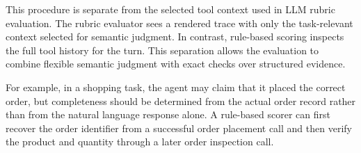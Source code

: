 \documentclass{llmxive}
\providecommand{\tcolorboxPromptExampleRuleBasedEvaluatorTitleText}{\fontsize{10}{12}\selectfont}
\providecommand{\tcolorboxPromptExampleRuleBasedEvaluatorCommonText}{\fontsize{7.5}{9}\selectfont}
\providecommand{\tcolorboxPromptExampleRuleBasedEvaluatorTitleBeforeVspace}{\vspace{10 pt}}
\providecommand{\tcolorboxPromptExampleRuleBasedEvaluatorCommonTextLineSkip}{\setlength{\baselineskip}{5 pt}}
\begin{document}
This procedure is separate from the selected tool context used in LLM rubric evaluation. The rubric evaluator sees a rendered trace with only the task-relevant context selected for semantic judgment. In contrast, rule-based scoring inspects the full tool history for the turn. This separation allows the evaluation to combine flexible semantic judgment with exact checks over structured evidence.

For example, in a shopping task, the agent may claim that it placed the correct order, but completeness should be determined from the actual order record rather than from the natural language response alone. A rule-based scorer can first recover the order identifier from a successful order placement call and then verify the product and quantity through a later order inspection call.


\renewcommand{\tcolorboxPromptExampleRuleBasedEvaluatorTitleText}{}
\renewcommand{\tcolorboxPromptExampleRuleBasedEvaluatorCommonText}{}
\renewcommand{\tcolorboxPromptExampleRuleBasedEvaluatorTitleBeforeVspace}{}
\renewcommand{\tcolorboxPromptExampleRuleBasedEvaluatorCommonTextLineSkip}{}
\end{document}
